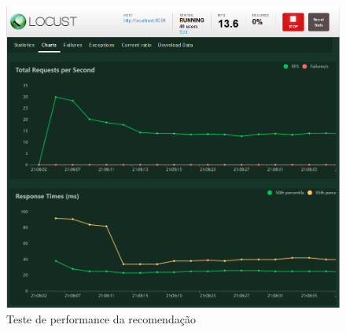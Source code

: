 \begin{figure}[ht]
    \begin{center}
    \includegraphics[width=390pt]{figuras/teste-performance.png}
    \caption{Teste de performance da recomendação}
    \label{fig:teste-performance}
    \end{center}
\end{figure}